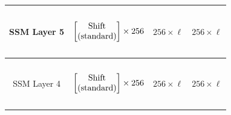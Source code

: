 \begin{table}[]
\begin{tabular}{@{}c|c|c|c@{}}
SSM Layer 5 & \begin{math}\begin{aligned} \begin{matrix} \text{\phantom{-}} \\ \end{matrix} \\ \begin{bmatrix} \text{\phantom{-} Shift \phantom{-}}   \\ \text{(standard)} \\ \end{bmatrix} \times 256 \\ \begin{matrix} \text{\phantom{-}} \\ \end{matrix} \\\end{aligned}\end{math}                                                                                                                                                                                                                                                                           & $256 \times \ell$ & $256 \times \ell$ \\ \midrule
SSM Layer 4 & \begin{math}\begin{aligned} \begin{matrix} \text{\phantom{-}} \\ \end{matrix} \\ \begin{bmatrix} \text{\phantom{-} Shift \phantom{-}}   \\ \text{(standard)} \\ \end{bmatrix} \times 256 \\ \begin{matrix} \text{\phantom{-}} \\ \end{matrix} \\\end{aligned}\end{math}                                                                                                                                                                                                                                                                           & $256 \times \ell$ & $256 \times \ell$ \\ \midrule

\end{tabular}
\end{table}
